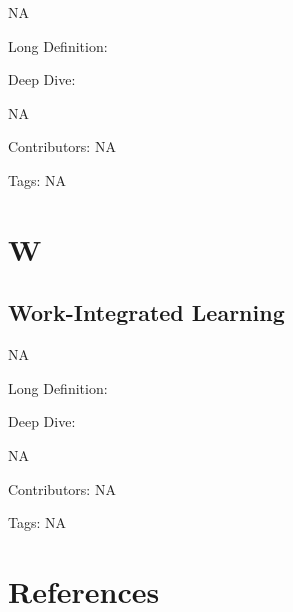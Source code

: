 \documentclass[
  letterpaper,
  DIV=11,
  numbers=noendperiod]{scrreprt}
\newlength{\cslhangindent}
\newenvironment{CSLReferences}[2] %
 {\begin{list}{}{%
  \setlength{\itemindent}{0pt}
  \setlength{\leftmargin}{0pt}
  \setlength{\parsep}{0pt}
  \ifodd #1
   \setlength{\leftmargin}{\cslhangindent}
   \setlength{\itemindent}{-1\cslhangindent}
  \fi
  \setlength{\itemsep}{#2\baselineskip}}}
 {\end{list}}
\begin{document}
NA

Long Definition:

Deep Dive:

NA

Contributors: NA

Tags: NA


\chapter{W}\label{w}

\section{Work-Integrated Learning}\label{work-integrated-learning}

NA

Long Definition:

Deep Dive:

NA

Contributors: NA

Tags: NA


\chapter*{References}\label{references}


\label{refs}
\begin{CSLReferences}{0}{1}
\end{CSLReferences}
\end{document}
